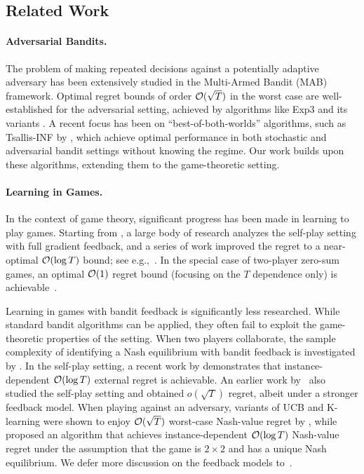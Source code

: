 \subsection{Related Work}

\paragraph{Adversarial Bandits.}
The problem of making repeated decisions against a potentially adaptive adversary has been extensively studied in the Multi-Armed Bandit (MAB) framework. Optimal regret bounds of order $\mathcal{O}(\sqrt{T})$ in the worst case are well-established for the adversarial setting, achieved by algorithms like Exp3 and its variants \citep{auer2002nonstochastic,bubeck2012regret}.
A recent focus has been on ``best-of-both-worlds'' algorithms, such as Tsallis-INF by \citet{zimmert2021tsallisinf}, which achieve optimal performance in both stochastic and adversarial bandit settings without knowing the regime. %
Our work builds upon these algorithms, extending them to the game-theoretic setting.

\paragraph{Learning in Games.}
In the context of game theory, significant progress has been made in learning to play games. Starting from \citet{daskalakis2011near,rakhlin2013optimization}, a large body of research analyzes the self-play setting with full gradient feedback, and a series of work improved the regret to a near-optimal $\mathcal{O}(\log T)$ bound; see e.g.,~\citet{syrgkanis2015fast, daskalakis2021near,farina2022near, soleymani2025cautious}. In the special case of two-player zero-sum games, an optimal $\mathcal{O}(1)$ regret bound (focusing on the $T$ dependence only) is achievable~\citep{rakhlin2013optimization, syrgkanis2015fast}. %

Learning in games with bandit feedback is significantly less researched. While standard bandit algorithms can be applied, they often fail to exploit the game-theoretic properties of the setting. When two players collaborate, the sample complexity of identifying a Nash equilibrium with bandit feedback is investigated by \citet{maiti2023instancedependent, maiti2024nearoptimal}. In the self-play setting, a recent work by \citet{ito2025instancedependent} demonstrates that instance-dependent $\mathcal{O}(\log T)$ external regret is achievable. 
An earlier work by~\citet{wei2018more} also studied the self-play setting and obtained $o(\sqrt{T})$ regret, albeit under a stronger feedback model.
When playing against an adversary,
variants of UCB and K-learning were shown to enjoy $\mathcal{O}(\sqrt T)$ worst-case Nash-value regret by \citet{odonoghue2021matrix},
while \citet{maiti2025limitations} proposed an algorithm that achieves instance-dependent $\mathcal{O}(\log T)$ Nash-value regret under the assumption that the game is $2\times 2$ and has a unique Nash equilibrium. We defer more discussion on the feedback models to~.


